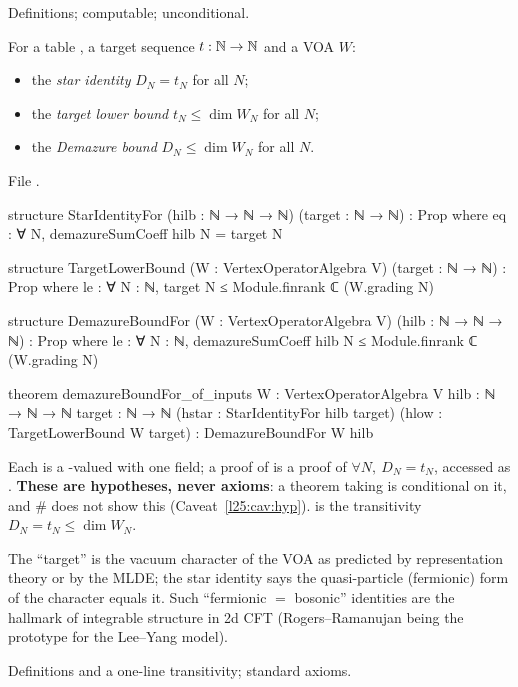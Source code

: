\begin{status}
Definitions; computable; unconditional.
\end{status}

\begin{definition}\label{l25:def:inputs}
For a table , a target sequence $t:{\mathbb{N}}\to{\mathbb{N}}$ and a VOA $W$:
\begin{itemize}
\item the \emph{star identity} $D_N=t_N$ for all $N$;
\item the \emph{target lower bound} $t_N\le\dim W_N$ for all $N$;
\item the \emph{Demazure bound} $D_N\le\dim W_N$ for all $N$.
\end{itemize}
\end{definition}
\noindent File .
\begin{leancode}
structure StarIdentityFor (hilb : ℕ → ℕ → ℕ) (target : ℕ → ℕ) : Prop where
  eq : ∀ N, demazureSumCoeff hilb N = target N

structure TargetLowerBound (W : VertexOperatorAlgebra V) (target : ℕ → ℕ) : Prop where
  le : ∀ N : ℕ, target N ≤ Module.finrank ℂ (W.grading N)

structure DemazureBoundFor (W : VertexOperatorAlgebra V) (hilb : ℕ → ℕ → ℕ) : Prop where
  le : ∀ N : ℕ, demazureSumCoeff hilb N ≤ Module.finrank ℂ (W.grading N)

theorem demazureBoundFor_of_inputs {W : VertexOperatorAlgebra V} {hilb : ℕ → ℕ → ℕ}
    {target : ℕ → ℕ} (hstar : StarIdentityFor hilb target) (hlow : TargetLowerBound W target) :
    DemazureBoundFor W hilb
\end{leancode}
\begin{dictionary}
Each is a -valued  with one field; a proof of  is a
proof of $\forall N,\ D_N=t_N$, accessed as . \textbf{These are hypotheses, never axioms}: a
theorem taking  is conditional on it, and \# does not
show this (Caveat~\ref{l25:cav:hyp}).  is the transitivity
$D_N=t_N\le\dim W_N$.
\end{dictionary}
\begin{physics}
The ``target'' is the vacuum character of the VOA as predicted by representation theory or by the MLDE; the
star identity says the quasi-particle (fermionic) form of the character equals it. Such ``fermionic $=$
bosonic'' identities are the hallmark of integrable structure in 2d CFT (Rogers--Ramanujan being the
prototype for the Lee--Yang model).
\end{physics}
\begin{status}
Definitions and a one-line transitivity; standard axioms.
\end{status}

